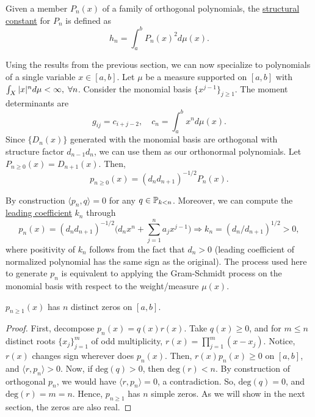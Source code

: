 \begin{definition}\normalfont
	Given a member $P_n(x)$ of a family of orthogonal polynomials, the \underline{structural constant} for $P_n$ is defined as
	\begin{equation}
	h_n = \int_a^b P_n(x)^2d\mu(x).
	\end{equation}
\end{definition}
\vspace{-10pt}
Using the results from the previous section, we can now specialize to polynomials of a single variable $x \in [a,b]$. Let $\mu$ be a measure supported on $[a,b]$ with $\int_{X}|x|^n d\mu < \infty,\; \forall n$. Consider the monomial basis $\{x^{j-1}\}_{j\geq 1}$. The moment determinants are $$g_{ij} = c_{i+j-2},\quad c_n = \int_{a}^b x^n d\mu(x).$$ Since $\{D_n(x)\}$ generated with the monomial basis are orthogonal with structure factor $d_{n-1}d_n$, we can use them as our orthonormal polynomials. Let $P_{n\geq0}(x) = D_{n+1}(x)$. Then,
\begin{equation}
p_{n\geq 0}(x) = (d_nd_{n+1})^{-1/2}P_{n}(x).
\end{equation}

By construction $\langle p_n,q\rangle = 0$ for any $q \in \mathbb{P}_{k<n}$. Moreover, we can compute the \underline{leading coefficient} $k_n$ through \begin{equation}\label{eq:orthnormlead}
p_n(x)=(d_nd_{n+1})^{-1/2}\big(d_nx^n+ \sum_{j=1}^n a_jx^{j-1}\big)\Rightarrow k_n = (d_n/d_{n+1})^{1/2} > 0,
\end{equation}
where positivity of $k_n$ follows from the fact that $d_n > 0$ (leading coefficient of normalized polynomial has the same sign as the original). The process used here to generate $p_n$ is equivalent to applying the Gram-Schmidt process on the monomial basis with respect to the weight/measure $\mu(x)$.
\begin{theorem}\normalfont
$p_{n\geq 1}(x)$ has $n$ distinct zeros on $[a,b]$.
\end{theorem}
\begin{proof}
First, decompose $p_n(x) = q(x)r(x)$. Take $q(x) \geq 0$, and for $m\leq n$ distinct roots $\{x_j\}_{j=1}^m$ of odd multiplicity, $r(x) = \prod_{j=1}^m(x-x_j)$. Notice, $r(x)$ changes sign wherever does $p_n(x)$. Then, $r(x)p_n(x) \geq 0$ on $[a,b]$, and $\langle r,p_n\rangle > 0$. Now, if $\text{deg}(q) > 0$, then $\text{deg}(r) < n$. By construction of orthogonal $p_n$, we would have $\langle r, p_n\rangle = 0$, a contradiction. So, $\text{deg}(q) = 0$, and $\text{deg}(r) = m = n$. Hence, $p_{n\geq 1}$ has $n$ simple zeros. As we will show in the next section, the zeros are also real.
\end{proof}


